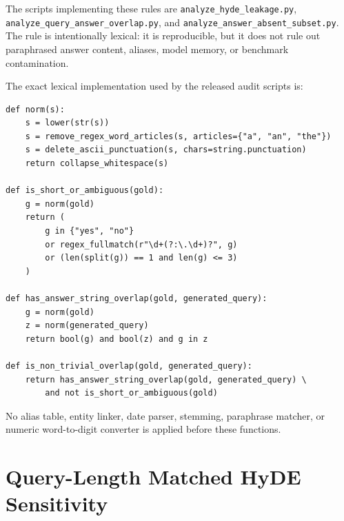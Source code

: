 \documentclass[pdflatex,sn-basic,Numbered]{sn-jnl}
\begin{document}
\begin{table}[t]
\begin{threeparttable}
\begin{tabularx}{\textwidth}{>{\raggedright\arraybackslash}p{}
                            >{\raggedright\arraybackslash}X}
\bottomrule
\end{tabularx}
\begin{tablenotes}
\footnotesize
\item The scripts implementing these rules are \texttt{analyze\_hyde\_leakage.py}, \texttt{analyze\_query\_answer\_overlap.py}, and \texttt{analyze\_answer\_absent\_subset.py}. The rule is intentionally lexical: it is reproducible, but it does not rule out paraphrased answer content, aliases, model memory, or benchmark contamination.
\end{tablenotes}
\end{threeparttable}
\end{table}

The exact lexical implementation used by the released audit scripts is:
\begingroup\footnotesize
\begin{verbatim}
def norm(s):
    s = lower(str(s))
    s = remove_regex_word_articles(s, articles={"a", "an", "the"})
    s = delete_ascii_punctuation(s, chars=string.punctuation)
    return collapse_whitespace(s)

def is_short_or_ambiguous(gold):
    g = norm(gold)
    return (
        g in {"yes", "no"}
        or regex_fullmatch(r"\d+(?:\.\d+)?", g)
        or (len(split(g)) == 1 and len(g) <= 3)
    )

def has_answer_string_overlap(gold, generated_query):
    g = norm(gold)
    z = norm(generated_query)
    return bool(g) and bool(z) and g in z

def is_non_trivial_overlap(gold, generated_query):
    return has_answer_string_overlap(gold, generated_query) \
        and not is_short_or_ambiguous(gold)
\end{verbatim}
\endgroup
No alias table, entity linker, date parser, stemming, paraphrase matcher, or
numeric word-to-digit converter is applied before these functions.








\FloatBarrier
\section{Query-Length Matched HyDE Sensitivity}
\label{sec:supp_query_length_matched_hyde}
\end{document}
